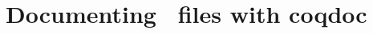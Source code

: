 





\section[Documenting \Coq\ files with coqdoc]{Documenting \Coq\ files with coqdoc\label{coqdoc}
}



